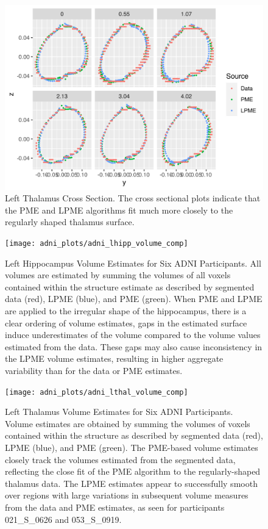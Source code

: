 \documentclass[11pt,reqno]{article}
\renewcommand{\textwidth}{180mm}
\theoremstyle{definition}
\begin{document}
\begin{figure}[h]
  \centering
  \includegraphics[width=\textwidth]{adni_plots/adni_lthal_cross_section}
  \caption{Left Thalamus Cross Section. The cross sectional plots indicate that the PME and LPME algorithms fit much more closely to the regularly shaped thalamus surface.}
  \label{fig:lthal_cross_sections}
\end{figure}



\begin{figure}[h]
  \centering
  \texttt{[image: adni\_plots/adni\_lhipp\_volume\_comp]}
  \caption{Left Hippocampus Volume Estimates for Six ADNI Participants. All volumes are estimated by summing the volumes of all voxels contained within the structure estimate as described by segmented data (red), LPME (blue), and PME (green). When PME and LPME are applied to the irregular shape of the hippocampus, there is a clear ordering of volume estimates, gaps in the estimated surface induce underestimates of the volume compared to the volume values estimated from the data. These gaps may also cause inconsistency in the LPME volume estimates, resulting in higher aggregate variability than for the data or PME estimates.}
  \label{fig:lhipp_volume_comparison}
\end{figure}

\begin{figure}[h]
  \centering
  \texttt{[image: adni\_plots/adni\_lthal\_volume\_comp]}
  \caption{Left Thalamus Volume Estimates for Six ADNI Participants. Volume estimates are obtained by summing the volumes of voxels contained within the structure as described by segmented data (red), LPME (blue), and PME (green). The PME-based volume estimates closely track the volumes estimated from the segmented data, reflecting the close fit of the PME algorithm to the regularly-shaped thalamus data. The LPME estimates appear to successfully smooth over regions with large variations in subsequent volume measures from the data and PME estimates, as seen for participants 021\_S\_0626 and 053\_S\_0919.}
  \label{fig:lthal_volume_comparison}
\end{figure}
\end{document}
